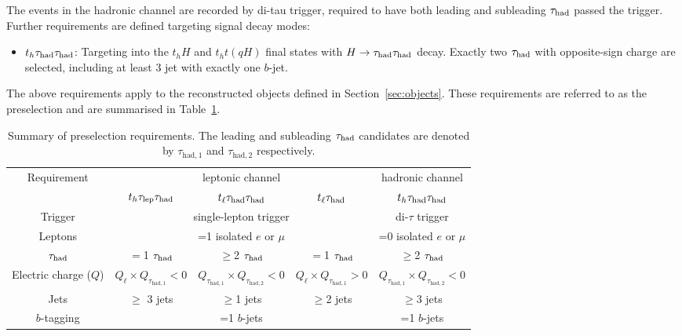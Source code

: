 The events in the hadronic channel are recorded by di-tau trigger, required to have both leading and subleading $\tau_{\mathrm{had}}$ passed the trigger. Further requirements are defined targeting signal decay modes:
\begin{itemize}
\item $t_h\tau_{\mathrm{had}} \tau_{\mathrm{had}}$: Targeting into the $t_hH$ and $t_ht(qH)$ final states with $H\to\tau_{\mathrm{had}} \tau_{\mathrm{had}}$ decay. Exactly two $\tau_{\mathrm{had}}$ with opposite-sign charge are selected, including at least 3 jet with exactly one $b$-jet.
\end{itemize}

The above requirements apply to the reconstructed objects defined in Section~\ref{sec:objects}.
These requirements are referred to as the preselection and are summarised in Table~\ref{tab:preselection}. 

\begin{table*}[t!]
\caption{\small{Summary of preselection requirements. 
The leading and subleading $\tau_{\mathrm{had}}$ candidates are denoted by $\tau_{\mathrm{had,1}}$ and $\tau_{\mathrm{had,2}}$ respectively.}}
\begin{center}
\begin{tabular}{c|ccc|c}
\toprule\toprule
\multirow{2}{*}{Requirement} &  \multicolumn{3}{c|}{leptonic channel}  & \multicolumn{1}{c}{hadronic channel} \\ 
& $t_h\tau_{\mathrm{lep}} \tau_{\mathrm{had}}$ & $t_{\ell}\tau_{\mathrm{had}} \tau_{\mathrm{had}}$ &  $t_{\ell}\tau_{\mathrm{had}}$ & $t_h\tau_{\mathrm{had}} \tau_{\mathrm{had}}$\\
\midrule
Trigger & \multicolumn{3}{c|}{single-lepton trigger} & di-$\tau$ trigger  \\
Leptons  & \multicolumn{3}{c|}{=1 isolated $e$ or $\mu$}  & =0 isolated $e$ or $\mu$ \\
$\tau_{\mathrm{had}}$  & $=$1 $\tau_{\mathrm{had}}$ & $\geq$2 $\tau_{\mathrm{had}}$ & $=$1 $\tau_{\mathrm{had}}$ & $\geq$2 $\tau_{\mathrm{had}}$ \\
Electric charge ($Q$) & $Q_\ell \times Q_{\tau_{\mathrm{had,1}}} < 0$ & $Q_{\tau_{\mathrm{had,1}}} \times Q_{\tau_{\mathrm{had,2}}} < 0$ & $Q_\ell \times Q_{\tau_{\mathrm{had,1}}} > 0$ & $Q_{\tau_{\mathrm{had,1}}} \times Q_{\tau_{\mathrm{had,2}}} < 0$ \\
Jets  &   $\geq$ 3 jets & $\geq$1 jets & $\geq$2 jets & $\geq$3 jets \\
$b$-tagging & \multicolumn{3}{c|}{=1 $b$-jets} & =1 $b$-jets\\
\bottomrule\bottomrule
\end{tabular}
\label{tab:preselection}
\end{center}
\end{table*}
